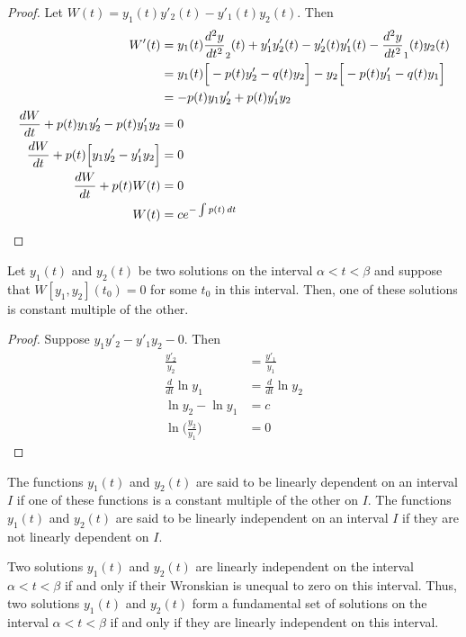 \documentclass[12pt]{article}
\begin{document}
\begin{proof} Let $W(t) = y_1(t)y'_2(t) - y'_1(t)y_2(t)$. Then $$\begin{aligned} W'(t) &= y_1(t)\frac{d^2y}{dt^2}_2(t) + y'_1y'_2(t) - y'_2(t)y'_1(t) - \frac{d^2y}{dt^2}_1(t)y_2(t) \\ &= y_1(t)\Big[-p(t)y'_2 - q(t)y_2\Big] - y_2\Big[-p(t)y'_1 - q(t)y_1\Big] \\ &= -p(t)y_1y'_2 + p(t)y'_1y_2 \\ \frac{dW}{dt} + p(t)y_1y'_2 - p(t)y'_1y_2 &= 0 \\ \frac{dW}{dt} + p(t)\Big[y_1y'_2 - y'_1y_2\Big] &= 0 \\ \frac{dW}{dt} + p(t)W(t) &= 0 \\ W(t) &= ce^{-\int p(t) \, dt} \end{aligned} $$\end{proof} 
\begin{theorem} Let $y_1(t)$ and $y_2(t)$ be two solutions on the interval $\alpha < t < \beta$ and suppose that $W[y_1, y_2](t_0) = 0$ for some $t_0$ in this interval. Then, one of these solutions is constant multiple of the other. \end{theorem} 
\begin{proof} Suppose $y_1y'_2 - y'_1y_2 - 0$. Then $$\begin{aligned} \frac{y'_2}{y_2} &= \frac{y'_1}{y_1} \\ \frac{d}{dt} \ln y_1 &= \frac{d}{dt} \ln y_2 \\ \ln y_2 - \ln y_1 &= c \\ \ln\Big(\frac{y_2}{y_1}\Big) &= 0 \end{aligned} $$ \end{proof} 
\begin{definition} The functions $y_1(t)$ and $y_2(t)$ are said to be linearly dependent on an interval $I$ if one of these functions is a constant multiple of the other on $I$. The functions $y_1(t)$ and $y_2(t)$ are said to be linearly independent on an interval $I$ if they are not linearly dependent on $I$. \end{definition}
\begin{theorem} Two solutions $y_1(t)$ and $y_2(t)$ are linearly independent on the interval $\alpha < t < \beta$ if and only if their Wronskian is unequal to zero on this interval. Thus, two solutions $y_1(t)$ and $y_2(t)$ form a fundamental set of solutions on the interval $\alpha < t < \beta$ if and only if they are linearly independent on this interval. \end{theorem} 
\end{document}
